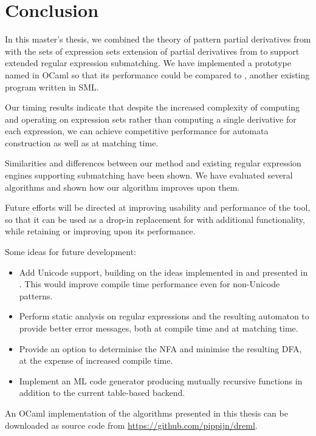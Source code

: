 \chapter{Conclusion}
\label{conclusion}

In this master's thesis, we combined the theory of pattern partial derivatives
from \cite{pdpat} with the sets of expression sets extension of partial
derivatives from \cite{pdere} to support extended regular expression
submatching. We have implemented a prototype named \dreml{} in OCaml so that its
performance could be compared to \mlulex, another existing program written in
SML.

Our timing results indicate that despite the increased complexity of computing
and operating on expression sets rather than computing a single derivative for
each expression, we can achieve competitive performance for automata
construction as well as at matching time.

Similarities and differences between our method and existing regular expression
engines supporting submatching have been shown. We have evaluated several
algorithms and shown how our algorithm improves upon them.

Future efforts will be directed at improving usability and performance of the
tool, so that it can be used as a drop-in replacement for \ocamllex{} with
additional functionality, while retaining or improving upon its performance.

Some ideas for future development:

\begin{itemize}

   \item Add Unicode support, building on the ideas implemented in \mlulex{} and
      presented in \cite{re-deriv}. This would improve compile time performance
      even for non-Unicode patterns.

   \item Perform static analysis on regular expressions and the resulting
      automaton to provide better error messages, both at compile time and at
      matching time.

   \item Provide an option to determinise the NFA and minimise the resulting
      DFA, at the expense of increased compile time.

   \item Implement an ML code generator producing mutually recursive functions
      in addition to the current table-based backend.

\end{itemize}

An OCaml implementation of the algorithms presented in this thesis can be
downloaded as source code from \url{https://github.com/pippijn/dreml}.


